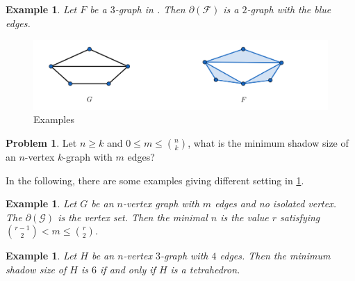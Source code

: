 \documentclass{article}
\newtheorem{example}[theorem]{Example}
\theoremstyle{definition}
\newtheorem{problem}[theorem]{Problem}
\begin{document}
\begin{example}
    Let $F$ be a $3$-graph in . Then $\partial (\mathcal{F})$ is a $2$-graph with the blue edges.
\end{example}


\begin{figure}[H]
        \centering
        \includegraphics[scale=0.3]{18-1.png}
        \caption{Examples}
        \label{fig:18-1}
\end{figure}



\begin{problem}\label{18-p}
    Let $n\geq k$ and $0\leq m\leq \binom{n}{k}$, what is the minimum shadow size of an $n$-vertex  $k$-graph with $m$ edges?
\end{problem}
In the following, there are some examples giving different setting in \cref{18-p}. 
\begin{example}
    Let $G$ be an $n$-vertex graph with $m$ edges and no isolated vertex. The $\partial (\mathcal{G})$ is the vertex set. Then the minimal $n$ is the value $r$ satisfying $\binom{r-1}{2}<m\leq \binom{r}{2}$. 
\end{example}
\begin{example}
    Let $H$ be an $n$-vertex $3$-graph with $4$ edges. Then the minimum shadow size of $H$ is $6$ if and only if $H$ is a tetrahedron.
\end{example}
\end{document}
